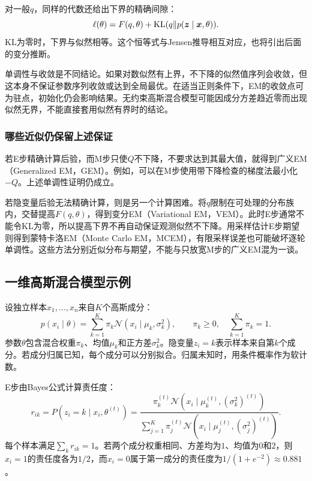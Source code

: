 对一般$q$，同样的代数还给出下界的精确间隙：
\begin{equation}
 \ell(\theta)=F(q,\theta)+\operatorname{KL}(q\|p(\bm z\mid\bm x,\theta)).
 \label{eq:solving-em-decomposition}
\end{equation}
KL为零时，下界与似然相等。这个恒等式与Jensen推导相互对应，也将引出后面的变分推断。

单调性与收敛是不同结论。如果对数似然有上界，不下降的似然值序列会收敛，但这本身不保证参数序列收敛或达到全局最优。在适当正则条件下，EM的收敛点可为驻点，初始化仍会影响结果。无约束高斯混合模型可能因成分方差趋近零而出现似然无界，不能直接套用似然有界时的结论。

\subsubsection{哪些近似仍保留上述保证}
若E步精确计算后验，而M步只使$Q$不下降，不要求达到其最大值，就得到广义EM（Generalized EM，GEM）。例如，可以在M步使用带下降检查的梯度法最小化$-Q$。上述单调性证明仍成立。

若隐变量后验无法精确计算，则是另一个计算困难。将$q$限制在可处理的分布族内，交替提高$F(q,\theta)$，得到变分EM（Variational EM，VEM）。此时E步通常不能令KL为零，所以提高下界不再自动保证观测似然不下降。用采样估计E步期望则得到蒙特卡洛EM（Monte Carlo EM，MCEM），有限采样误差也可能破坏逐轮单调性。这些方法分别近似分布与期望，不能与只放宽M步的广义EM混为一谈。

\subsection{一维高斯混合模型示例}
设独立样本$x_1,\ldots,x_n$来自$K$个高斯成分：
\begin{equation}
 p(x_i\mid\theta)=\sum_{k=1}^K\pi_k\mathcal N(x_i\mid\mu_k,\sigma_k^2),
 \qquad \pi_k\geq0,\quad \sum_{k=1}^K\pi_k=1.
\end{equation}
参数$\theta$包含混合权重$\pi_k$、均值$\mu_k$和正方差$\sigma_k^2$。隐变量$z_i=k$表示样本来自第$k$个成分。若成分归属已知，每个成分可以分别拟合。归属未知时，用条件概率作为软计数。

E步由Bayes公式计算责任度：
\begin{equation}
 r_{ik}=P(z_i=k\mid x_i,\theta^{(t)})
 =\frac{\pi_k^{(t)}\mathcal N(x_i\mid\mu_k^{(t)},(\sigma_k^2)^{(t)})}
 {\sum_{j=1}^K\pi_j^{(t)}\mathcal N(x_i\mid\mu_j^{(t)},(\sigma_j^2)^{(t)})}.
\end{equation}
每个样本满足$\sum_k r_{ik}=1$。若两个成分权重相同、方差均为$1$、均值为$0$和$2$，则$x_i=1$的责任度各为$1/2$，而$x_i=0$属于第一成分的责任度为$1/(1+e^{-2})\approx0.881$。

